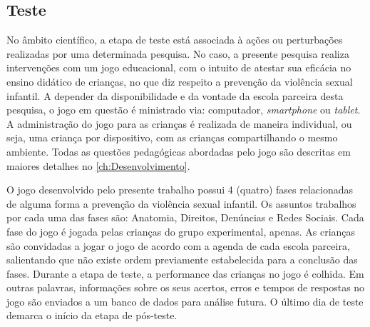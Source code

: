 \subsection{Teste}\label{subsec:teste}

No âmbito científico, a etapa de teste está associada à ações ou perturbações realizadas por uma determinada pesquisa. No caso, a presente pesquisa realiza intervenções com um jogo educacional, com o intuito de atestar sua eficácia no ensino didático de crianças, no que diz respeito a prevenção da violência sexual infantil. A depender da disponibilidade e da vontade da escola parceira desta pesquisa, o jogo em questão é ministrado via: computador, \textit{smartphone} ou \textit{tablet}. A administração do jogo para as crianças é realizada de maneira individual, ou seja, uma criança por dispositivo, com as crianças compartilhando o mesmo ambiente. Todas as questões pedagógicas abordadas pelo jogo são descritas em maiores detalhes no \autoref{ch:Desenvolvimento}. 

O jogo desenvolvido pelo presente trabalho possui 4 (quatro) fases relacionadas de alguma forma a prevenção da violência sexual infantil. Os assuntos trabalhos por cada uma das fases são: Anatomia, Direitos, Denúncias e Redes Sociais. Cada fase do jogo é jogada pelas crianças do grupo experimental, apenas. As crianças são convidadas a jogar o jogo de acordo com a agenda de cada escola parceira, salientando que não existe ordem previamente estabelecida para a conclusão das fases. Durante a etapa de teste, a performance das crianças no jogo é colhida. Em outras palavras, informações sobre os seus acertos, erros e tempos de respostas no jogo são enviados a um banco de dados para análise futura. O último dia de teste demarca o início da etapa de pós-teste. 



